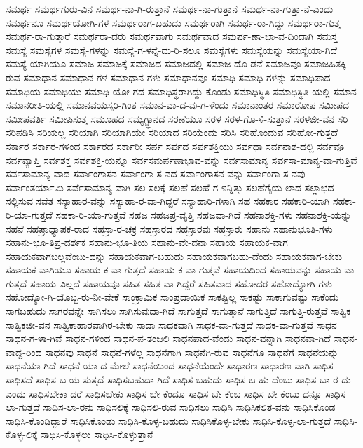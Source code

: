 {ಸಮರ್ಥ
ಸಮರ್ಥಗುರು-ವಿನ
ಸಮರ್ಥ-ನಾ-ಗಿ-ರುತ್ತಾನೆ
ಸಮರ್ಥ-ನಾ-ಗುತ್ತಾನೆ
ಸಮರ್ಥ-ನಾ-ಗುತ್ತಾ-ನೆ-ಎಂದು
ಸಮರ್ಥನೂ
ಸಮರ್ಥಯೋಗಿ-ಗಳ
ಸಮರ್ಥರಾಗ-ಬಹುದು
ಸಮರ್ಥರಾಗಿ
ಸಮರ್ಥ-ರಾ-ಗಿದ್ದು
ಸಮರ್ಥರಾ-ಗುತ್ತ
ಸಮರ್ಥ-ರಾ-ಗುತ್ತಾರೆ
ಸಮರ್ಥರಾ-ದರು
ಸಮರ್ಥವಾಗು
ಸಮರ್ಥವಾದ
ಸಮರ್ಪ-ಣಾ-ಭಾ-ವ-ದಿಂದಾಗಿ
ಸಮಸ್ತ
ಸಮಸ್ಯೆ
ಸಮಸ್ಯೆಗಳ
ಸಮಸ್ಯೆ-ಗಳನ್ನು
ಸಮಸ್ಯೆ-ಗ-ಳನ್ನೆ-ದು-ರಿ-ಸಲೂ
ಸಮಸ್ಯೆಗಳು
ಸಮಸ್ಯೆಯನ್ನು
ಸಮಸ್ಯೆಯಾ-ಗಿದೆ
ಸಮಸ್ಯೆ-ಯಾಗಿಯೂ
ಸಮಾಜ
ಸಮಾಜಕ್ಕೆ
ಸಮಾಜದ
ಸಮಾಜದಲ್ಲಿ
ಸಮಾಜ-ದೊ-ಡನೆ
ಸಮಾಜವೂ
ಸಮಾಜಹಿತಕ್ಕಿ-ರುವ
ಸಮಾಧಾನ
ಸಮಾಧಾನ-ಗಳ
ಸಮಾಧಾನ-ಗಳು
ಸಮಾಧಾನವೂ
ಸಮಾಧಿ
ಸಮಾಧಿ-ಗಳನ್ನು
ಸಮಾಧಿಪಾದ
ಸಮಾಧಿಯ
ಸಮಾಧಿಯು
ಸಮಾಧಿ-ಯೋ-ಗದ
ಸಮಾಧಿಸ್ಥರಾಗಿದ್ದು-ಕೊಂಡು
ಸಮಾಧಿಸ್ಥಿತಿ
ಸಮಾಧಿಸ್ಥಿತಿ-ಯಲ್ಲಿ
ಸಮಾನ
ಸಮಾನರೀತಿ-ಯಲ್ಲಿ
ಸಮಾನವಯಸ್ಕರಿ-ಗಿಂತ
ಸಮಾನ-ವಾ-ದ-ವು-ಗ-ಳೆಂದು
ಸಮಾನಾಂತರ
ಸಮಾರೋಪ
ಸಮೀಪದ
ಸಮೀಪವರ್ತಿ
ಸಮೀಪಿಸುತ್ತ
ಸಮೂಹದ
ಸಮ್ಯಗ್ಜ್ಞಾನದ
ಸರಣೆಯೂ
ಸರಳ
ಸರಳ-ಗೊ-ಳಿ-ಸುತ್ತಾನೆ
ಸರಳಜೀ-ವನ
ಸರಿ
ಸರಿಪಡಿಸಿ
ಸರಿಯಲ್ಲ
ಸರಿಯಾಗಿ
ಸರಿಯಾಗಿಯೇ
ಸರಿಯಾದ
ಸರಿಯೆಂದು
ಸರಿಸಿ
ಸರಿಹೊಂದುವ
ಸರಿಹೋ-ಗುತ್ತದೆ
ಸರ್ಕಾರ
ಸರ್ಕಾರ-ಗಳಿಂದ
ಸರ್ಕಾರದ
ಸರ್ಕಾರೀ
ಸರ್ಪ
ಸರ್ಪದ
ಸರ್ಪಶಕ್ತಿಯು
ಸರ್ವಥಾ
ಸರ್ವನಾಶ-ದಲ್ಲಿ
ಸರ್ವವೂ
ಸರ್ವವ್ಯಾಪ್ತಿ
ಸರ್ವಶಕ್ತ
ಸರ್ವಶಕ್ತಿ-ಯನ್ನೂ
ಸರ್ವಸಮರ್ಪಣಾಭಾವ-ವನ್ನು
ಸರ್ವಸಾಮಾನ್ಯ
ಸರ್ವಸಾ-ಮಾನ್ಯ-ವಾ-ಗುತ್ತಿವೆ
ಸರ್ವಸಾಮಾನ್ಯ-ವಾದ
ಸರ್ವಾಂಗಾಸನ
ಸರ್ವಾಂಗಾ-ಸ-ನದ
ಸರ್ವಾಂಗಾಸನ-ವನ್ನು
ಸರ್ವಾಂಗಾ-ಸ-ನವು
ಸರ್ವಾಂತರ್ಯಾಮಿ
ಸರ್ವೆಸಾಮಾನ್ಯ-ವಾಗಿ
ಸಲ
ಸಲಕ್ಕೆ
ಸಲಹೆ
ಸಲಹೆ-ಗ-ಳನ್ನಿತ್ತು
ಸಲಹೆಗೈಯ-ಲಾದ
ಸಲ್ಲಾಭದ
ಸಲ್ಲಿಸುವ
ಸವೆತ
ಸಸ್ಯಾಹಾರ-ವನ್ನು
ಸಸ್ಯಾಹಾ-ರ-ವಾ-ಗಿದ್ದರೆ
ಸಸ್ಯಾಹಾರಿ-ಗಳಾಗಿ
ಸಹ
ಸಹಕಾರ
ಸಹಕಾರಿ-ಯಾಗಿ
ಸಹಕಾ-ರಿ-ಯಾ-ಗುತ್ತದೆ
ಸಹಕಾ-ರಿ-ಯಾ-ಗುತ್ತವೆ
ಸಹಜ
ಸಹಜಪ್ರ-ವೃತ್ತಿ
ಸಹಜವಾ-ಗಿದೆ
ಸಹನಾಶಕ್ತಿ-ಗಳು
ಸಹನಾಶಕ್ತಿ-ಯನ್ನು
ಸಹನೆ
ಸಹಪ್ರಾಧ್ಯಾಪಕ-ರಾದ
ಸಹಸ್ರಾ-ರ-ಚಕ್ರ
ಸಹಸ್ರಾರದ
ಸಹಸ್ರಾರವು
ಸಹಸ್ರಾರು
ಸಹಾನು
ಸಹಾನುಭೂತಿ-ಗಳು
ಸಹಾನು-ಭೂ-ತಿಪ್ರ-ದರ್ಶಕ
ಸಹಾನು-ಭೂ-ತಿಯ
ಸಹಾನು-ವೇ-ದನಾ
ಸಹಾಯ
ಸಹಾಯಕ-ವಾಗ
ಸಹಾಯಕವಾಗಬಲ್ಲವೆಂಬು-ದನ್ನು
ಸಹಾಯಕವಾಗ-ಬಹುದು
ಸಹಾಯಕವಾಗಬಹು-ದೆಂದು
ಸಹಾಯಕವಾಗ-ಬೇಕು
ಸಹಾಯಕ-ವಾಗಿಯೂ
ಸಹಾಯ-ಕ-ವಾ-ಗುತ್ತದೆ
ಸಹಾಯ-ಕ-ವಾ-ಗುತ್ತವೆ
ಸಹಾಯದಿಂದ
ಸಹಾಯವನ್ನು
ಸಹಾಯ-ವಾ-ಗುತ್ತದೆ
ಸಹಾಯ-ವಿಲ್ಲದೆ
ಸಹಾಯವೂ
ಸಹಿತ
ಸಹಿತ-ವಾ-ಗಿದ್ದರೆ
ಸಹಿತವಾದ
ಸಹೋದರ
ಸಹೋದ್ಯೋಗಿ-ಗಳು
ಸಹೋದ್ಯೋ-ಗಿ-ಯೊಬ್ಬ-ರು-ನೀ-ವೇಕೆ
ಸಾಂಕ್ರಾಮಿಕ
ಸಾಂಪ್ರದಾಯಿಕ
ಸಾಕಷ್ಟಿಲ್ಲ
ಸಾಕಷ್ಟು
ಸಾಕಾಗುವಷ್ಟು
ಸಾಕೆಂದು
ಸಾಗಬಹುದು
ಸಾಗರವನ್ನೇ
ಸಾಗಿಸಲು
ಸಾಗಿಸುವುದಾ-ಗಿದೆ
ಸಾಗುತ್ತದೆ
ಸಾಗುತ್ತಾನೆ
ಸಾಗುತ್ತಿದೆ
ಸಾಗುತ್ತಿ-ರುತ್ತವೆ
ಸಾತ್ವಿಕ
ಸಾತ್ವಿಕಜೀ-ವನ
ಸಾತ್ವಿಕಾಹಾರವಾಗಿರ-ಬೇಕು
ಸಾದಾ
ಸಾಧಕವಾಗಿ
ಸಾಧಕ-ವಾ-ಗುತ್ತದೆ
ಸಾಧಕ-ವಾ-ಗುತ್ತವೆ
ಸಾಧನ
ಸಾಧನ-ಗ-ಳಾ-ಗಿವೆ
ಸಾಧನ-ಗಳಿಂದ
ಸಾಧನ-ಪ-ತಂಜಲಿ
ಸಾಧನಪಾದ-ವೆಂದು
ಸಾಧನ-ವನ್ನಾಗಿ
ಸಾಧನವಾ-ಗಿದೆ
ಸಾಧನ-ವಾದ್ದ-ರಿಂದ
ಸಾಧನವು
ಸಾಧನೆ
ಸಾಧನೆ-ಗಳೆಲ್ಲ
ಸಾಧನೆಗಾಗಿ
ಸಾಧನೆಗಿ-ರುವ
ಸಾಧನೆಗೂ
ಸಾಧನೆಗೆ
ಸಾಧನೆಯನ್ನು
ಸಾಧನೆಯಾ-ಗಿದೆ
ಸಾಧನೆ-ಯಾ-ದ-ಮೇಲೆ
ಸಾಧನೆಯಿಂದ
ಸಾಧನೆಯೆಂದೇ
ಸಾಧಾರಣ
ಸಾಧಾರಣ-ವಾಗಿ
ಸಾಧಿಸ
ಸಾಧಿಸದೆ
ಸಾಧಿಸ-ಬ-ಯ-ಸುತ್ತದೆ
ಸಾಧಿಸಬಹುದಾ-ಗಿದೆ
ಸಾಧಿಸ-ಬಹುದು
ಸಾಧಿಸ-ಬ-ಹು-ದೆಂಬು
ಸಾಧಿಸ-ಬಾ-ರ-ದು-ಎಂದು
ಸಾಧಿಸಬೇಕಾ-ದರೆ
ಸಾಧಿಸಬೇಕು
ಸಾಧಿಸ-ಬೇ-ಕೆಂದೂ
ಸಾಧಿಸ-ಬೇ-ಕೆಂಬ
ಸಾಧಿಸ-ಬೇ-ಕೆಂಬು-ದನ್ನೂ
ಸಾಧಿಸ-ಲಾ-ಗುತ್ತದೆ
ಸಾಧಿಸ-ಲಾ-ರನು
ಸಾಧಿಸಲಿಕ್ಕೆ
ಸಾಧಿಸಲಿ-ರುವ
ಸಾಧಿಸಲು
ಸಾಧಿಸಿ
ಸಾಧಿಸಿಕಲಿತ-ವನು
ಸಾಧಿಸಿಕೊಂಡ
ಸಾಧಿಸಿ-ಕೊಂಡಿದ್ದಾರೆ
ಸಾಧಿಸಿಕೊಂಡು
ಸಾಧಿಸಿ-ಕೊಳ್ಳ-ಬಹುದು
ಸಾಧಿಸಿಕೊಳ್ಳ-ಬೇಕು
ಸಾಧಿಸಿ-ಕೊಳ್ಳ-ಲಾ-ಗುತ್ತದೆ
ಸಾಧಿಸಿ-ಕೊಳ್ಳ-ಲಿಕ್ಕೆ
ಸಾಧಿಸಿ-ಕೊಳ್ಳಲು
ಸಾಧಿಸಿ-ಕೊಳ್ಳುತ್ತಾನೆ
}
